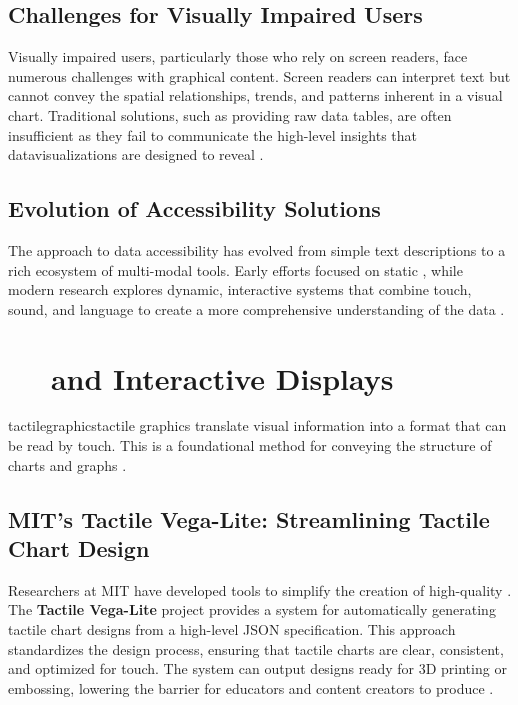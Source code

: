 \subsection{Challenges for Visually Impaired Users}\label{ch13:ssec:challenges}
Visually impaired users, particularly those who rely on screen readers, face numerous challenges with graphical content. Screen readers can interpret text but cannot convey the spatial relationships, trends, and patterns inherent in a visual chart. Traditional solutions, such as providing raw data tables, are often insufficient as they fail to communicate the high-level insights that \gls{datavisualization}s are designed to reveal \supercite{Lundgard2021, Zewe2021Making}.

\subsection{Evolution of Accessibility Solutions}\label{ch13:ssec:evolution}
The approach to data accessibility has evolved from simple text descriptions to a rich ecosystem of multi-modal tools. Early efforts focused on static , while modern research explores dynamic, interactive systems that combine touch, sound, and language to create a more comprehensive understanding of the data \supercite{Zewe2022Making, Lundgard2022Accessible}.

\section{~~ and Interactive Displays}\label{ch13:sec:tactile-graphics}
\gls{tactilegraphics}tactile graphics translate visual information into a format that can be read by touch. This is a foundational method for conveying the structure of charts and graphs \supercite{CreatingTactileGraphics}.

\subsection{MIT's Tactile Vega-Lite: Streamlining Tactile Chart Design}\label{ch13:ssec:tactile-vega-lite}
Researchers at MIT have developed tools to simplify the creation of high-quality . The \textbf{Tactile Vega-Lite} project provides a system for automatically generating tactile chart designs from a high-level JSON specification. This approach standardizes the design process, ensuring that tactile charts are clear, consistent, and optimized for touch. The system can output designs ready for 3D printing or embossing, lowering the barrier for educators and content creators to produce  \supercite{TactileVegaLite}.

